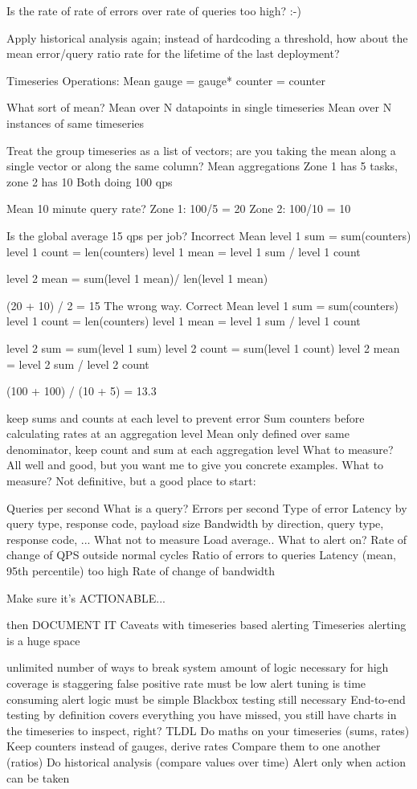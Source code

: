 \documentclass[online,12pt,helvetica]{chaksem}
\begin{document}
Is the rate of rate of errors over rate of queries too high? :-)

Apply historical analysis again; instead of hardcoding a threshold, how about the mean error/query ratio rate for the lifetime of the last deployment?

Timeseries Operations: Mean
gauge = gauge*
counter = counter


What sort of mean?
Mean over N datapoints in single timeseries
Mean over N instances of same timeseries

Treat the group timeseries as a list of vectors; are you taking the mean along a single vector or along the same column?
Mean aggregations
Zone 1 has 5 tasks, zone 2 has 10
Both doing 100 qps

Mean 10 minute query rate?
Zone 1: 100/5 = 20
Zone 2: 100/10 = 10

Is the global average 15 qps per job?
Incorrect Mean
level 1 sum = sum(counters)
level 1 count = len(counters)
level 1 mean = level 1 sum / level 1 count

level 2 mean = sum(level 1 mean)/ len(level 1 mean)

(20 + 10)  / 2 = 15
The wrong way.
Correct Mean
level 1 sum = sum(counters)
level 1 count = len(counters)
level 1 mean = level 1 sum / level 1 count

level 2 sum = sum(level 1 sum)
level 2 count = sum(level 1 count)
level 2 mean = level 2 sum / level 2 count

(100 + 100) / (10 + 5) = 13.3

keep sums and counts at each level to prevent error
Sum counters before calculating rates at an aggregation level
Mean only defined over same denominator, keep count and sum at each aggregation level
What to measure?
All well and good, but you want me to give you concrete examples.
What to measure?
Not definitive, but a good place to start:

Queries per second
What is a query?
Errors per second
Type of error
Latency
by query type, response code, payload size
Bandwidth
by direction, query type, response code, ...
What not to measure
Load average..
What to alert on?
Rate of change of QPS outside normal cycles
Ratio of errors to queries
Latency (mean, 95th percentile) too high
Rate of change of bandwidth

Make sure it's ACTIONABLE...

then DOCUMENT IT
Caveats with timeseries based alerting
Timeseries alerting is a huge space

unlimited number of ways to break system
amount of logic necessary for high coverage is staggering
false positive rate must be low
alert tuning is time consuming
alert logic must be simple
Blackbox testing still necessary
End-to-end testing by definition covers everything you have missed,
you still have charts in the timeseries to inspect, right?
TLDL
Do maths on your timeseries (sums, rates)
Keep counters instead of gauges, derive rates
Compare them to one another (ratios)
Do historical analysis (compare values over time)
Alert only when action can be taken
\end{document}
